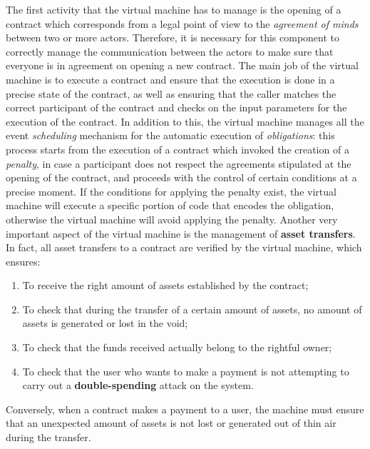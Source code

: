 The first activity that the virtual machine has to manage is the opening of a contract which corresponds 
from a legal point of view to the \textit{agreement of minds} between two or more actors. Therefore, it is 
necessary for this component to correctly manage the communication between the actors to make sure that 
everyone is in agreement on opening a new contract. The main job of the virtual machine is to execute a 
contract and ensure that the execution is done in a precise state of the contract, as well as ensuring that 
the caller matches the correct participant of the contract and checks on the input parameters for the 
execution of the contract. In addition to this, the virtual machine manages all the event 
\textit{scheduling} mechanism for the automatic execution of \textit{obligations}: this process starts from 
the execution of a contract which invoked the creation of a \textit{penalty}, in case a participant does 
not respect the agreements stipulated at the opening of the contract, and proceeds with the control of 
certain conditions at a precise moment. If the conditions for applying the penalty exist, the virtual 
machine will execute a specific portion of code that encodes the obligation, otherwise the virtual machine 
will avoid applying the penalty. Another very important aspect of the virtual machine is the management of 
\textbf{asset transfers}. In fact, all asset transfers to a contract are verified by the virtual machine, 
which ensures:
\begin{enumerate}
	\item To receive the right amount of assets established by the contract;
	\item To check that during the transfer of a certain amount of assets, no amount of assets is generated 
	or lost in the void;
	\item To check that the funds received actually belong to the rightful owner;
	\item To check that the user who wants to make a payment is not attempting to carry out a 
	\textbf{double-spending} attack on the system.
\end{enumerate}
Conversely, when a contract makes a payment to a user, the machine must ensure that an unexpected amount 
of assets is not lost or generated out of thin air during the transfer.

